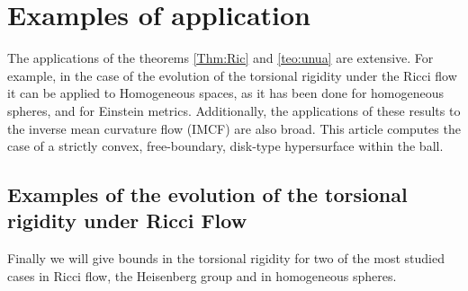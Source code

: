 \documentclass{amsart}
\theoremstyle{definition}
\theoremstyle{remark}
\begin{document}
\section{Examples of application}\label{sec:examples}
The applications of the theorems \ref{Thm:Ric} and \ref{teo:unua} are extensive. For example, in the case of the evolution of the torsional rigidity under the Ricci flow it can be applied to Homogeneous spaces, as it has been done for homogeneous spheres, and for Einstein metrics. Additionally, the applications of these results to the inverse mean curvature flow (IMCF) are also broad. This article computes the case of a strictly convex, free-boundary, disk-type hypersurface within the ball.

\subsection{Examples of the evolution of the torsional rigidity under Ricci Flow}

Finally we will give bounds in the torsional rigidity for two of the most studied cases in Ricci flow, the Heisenberg group and in homogeneous spheres. 
\end{document}
